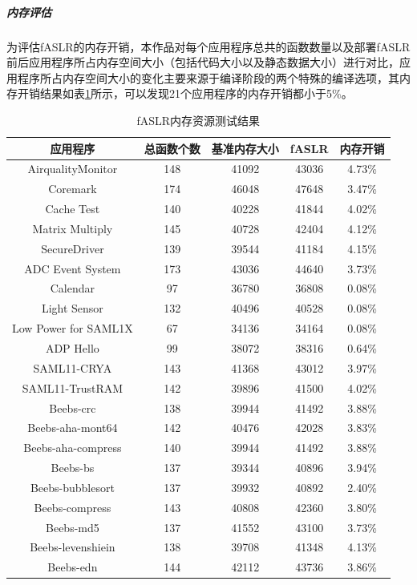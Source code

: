 \documentclass[12pt,a4paper]{ctexart}
\numberwithin{figure}{section}
\begin{document}
\subparagraph{内存评估}
\par 为评估fASLR的内存开销，本作品对每个应用程序总共的函数数量以及部署fASLR前后应用程序所占内存空间大小（包括代码大小以及静态数据大小）进行对比，应用程序所占内存空间大小的变化主要来源于编译阶段的两个特殊的编译选项，其内存开销结果如表\ref{table2}所示，可以发现21个应用程序的内存开销都小于5\%。
\begin{longtable}{ccccc}
    \caption{fASLR内存资源测试结果}
    \label{table2}                                         \\
    \hline
    应用程序                 & 总函数个数 & 基准内存大小 & fASLR & 内存开销   \\ \hline
    AirqualityMonitor    & 148   & 41092  & 43036 & 4.73\% \\ 
    Coremark             & 174   & 46048  & 47648 & 3.47\% \\ 
    Cache Test           & 140   & 40228  & 41844 & 4.02\% \\ 
    Matrix Multiply      & 145   & 40728  & 42404 & 4.12\% \\ 
    SecureDriver         & 139   & 39544  & 41184 & 4.15\% \\ 
    ADC Event System     & 173   & 43036  & 44640 & 3.73\% \\ 
    Calendar             & 97    & 36780  & 36808 & 0.08\% \\ 
    Light Sensor         & 132   & 40496  & 40528 & 0.08\% \\ 
    Low Power for SAML1X & 67    & 34136  & 34164 & 0.08\% \\ 
    ADP Hello            & 99    & 38072  & 38316 & 0.64\% \\ 
    SAML11-CRYA          & 143   & 41368  & 43012 & 3.97\% \\ 
    SAML11-TrustRAM      & 142   & 39896  & 41500 & 4.02\% \\ 
    Beebs-crc            & 138   & 39944  & 41492 & 3.88\% \\ 
    Beebs-aha-mont64     & 142   & 40476  & 42028 & 3.83\% \\ 
    Beebs-aha-compress   & 140   & 39944  & 41492 & 3.88\% \\ 
    Beebs-bs             & 137   & 39344  & 40896 & 3.94\% \\ 
    Beebs-bubblesort     & 137   & 39932  & 40892 & 2.40\% \\ 
    Beebs-compress       & 143   & 40808  & 42360 & 3.80\% \\ 
    Beebs-md5            & 137   & 41552  & 43100 & 3.73\% \\ 
    Beebs-levenshiein    & 138   & 39708  & 41348 & 4.13\% \\ 
    Beebs-edn            & 144   & 42112  & 43736 & 3.86\% \\ \hline
\end{longtable}
\end{document}
